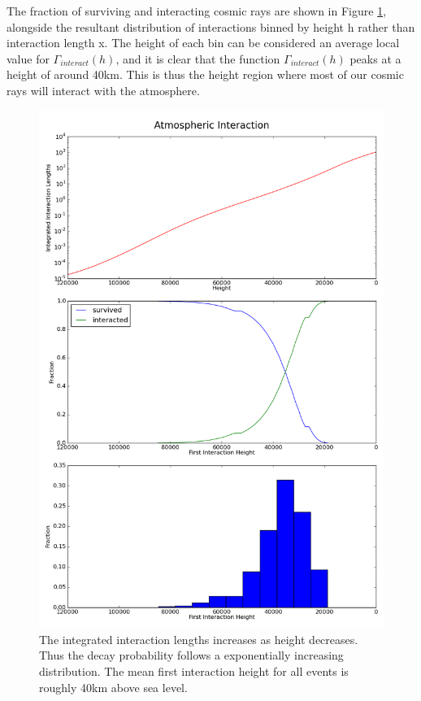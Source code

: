 \documentclass[11pt]{article}
\begin{document}
The fraction of surviving and interacting cosmic rays are shown in Figure \ref{fig:generalheight}, alongside the resultant distribution of interactions binned by height h rather than interaction length x. The height of each bin can be considered an average local value for $\Gamma_{interact}(h)$, and it is clear that the function $\Gamma_{interact}(h)$ peaks at a height of around 40km. This is thus the height region where most of our cosmic rays will interact with the atmosphere.

\begin{figure}
\begin{center}
\includegraphics[height=0.9\textheight]{generalheight}
\caption{The integrated interaction lengths increases as height decreases. Thus the decay probability follows a exponentially increasing distribution. The mean first interaction height for all events is roughly 40km above sea level.}
\label{fig:generalheight}
\end{center}
\end{figure}
\end{document}
